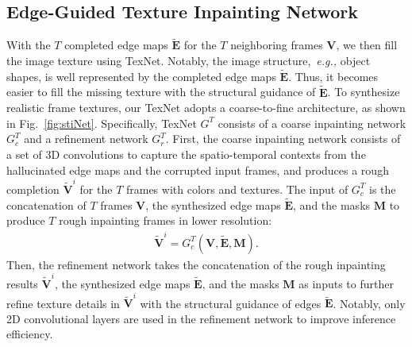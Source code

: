 \subsection{Edge-Guided Texture Inpainting Network}

 
With the $T$ completed edge maps $\boldsymbol{\widetilde{E}}$ for the $T$ neighboring frames $\boldsymbol{V}$, we then fill the image texture using TexNet.
Notably, the image structure,~\emph{e.g.,} object shapes, is well represented by the completed edge maps $\boldsymbol{\widetilde{E}}$.
Thus, it becomes easier to fill the missing texture with the structural guidance of $\boldsymbol{\widetilde{E}}$.
%
To synthesize realistic frame textures, our TexNet adopts a coarse-to-fine architecture, as shown in Fig.~\ref{fig:stiNet}.
Specifically, TexNet {\color{blue}$G^T$} consists of a coarse inpainting network {\color{blue}$G_c^T$} and a refinement network {\color{blue}$G_r^T$}.
%
First, the coarse inpainting network consists of a set of 3D convolutions to capture the spatio-temporal contexts from the hallucinated edge maps and the corrupted input frames, and produces a rough completion $\boldsymbol{\widetilde{V}}^i$ for the $T$ frames with colors and textures. {\color{blue}The input of $G^T_c$ is the concatenation of $T$ frames $\boldsymbol{V}$, the synthesized edge maps $\boldsymbol{\widetilde{E}}$, and the masks $\boldsymbol{M}$ to produce $T$ rough inpainting frames in lower resolution:}
{\color{blue}
	\begin{equation}
	\begin{aligned}
	\label{eq:coarsenet}
	\boldsymbol{\widetilde{V}}^i=G_{c}^T(\boldsymbol{V},\boldsymbol{\widetilde{E}},\boldsymbol{M}).
	\end{aligned}
	\end{equation}
}
Then, the refinement network takes {\color{blue}the concatenation of} the rough inpainting results $\boldsymbol{\widetilde{V}}^i$, the synthesized edge maps $\boldsymbol{\widetilde{E}}$, and the masks $\boldsymbol{M}$ as inputs to further refine texture details in $\boldsymbol{\widetilde{V}}^i$ with the structural guidance of edges $\boldsymbol{\widetilde{E}}$. 
Notably, only 2D convolutional layers are used in the refinement network to improve inference efficiency. 
